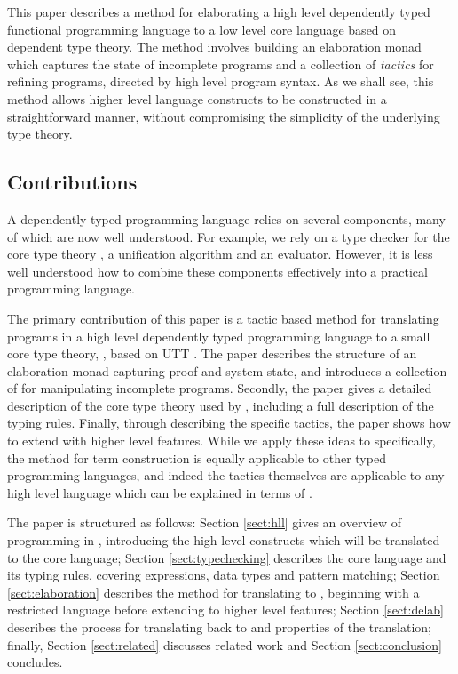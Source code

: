 This paper describes a method for elaborating a high level dependently typed
functional programming language to a low level core language based on dependent
type theory.  The method involves building an elaboration monad which captures
the state of incomplete programs and a collection of \emph{tactics} for
refining programs, directed by high level program syntax.  As we shall see,
this method allows higher level language constructs to be constructed in a
straightforward manner, without compromising the simplicity of the underlying
type theory.

\subsection{Contributions}

A dependently typed programming language relies on several components, many of
which are now well understood. For example, we rely on a type checker for
the core type theory \cite{Chapman2005epigram,loh2010tutorial}, a
unification algorithm \cite{Miller1992} and an evaluator. However, it is less
well understood how to combine these components effectively into a practical
programming language. 

The primary contribution of this paper is a tactic based method for translating
programs in a high level dependently typed programming language to a small core
type theory, \TT{}, based on UTT \cite{luo1994}. The paper describes the
structure of an elaboration monad capturing proof and system state, and
introduces a collection of  for manipulating incomplete
programs.  Secondly, the paper gives a detailed description of the core type
theory used by \Idris{}, including a full description of the typing rules.
Finally, through describing the specific tactics, the paper shows how to extend
\Idris{} with higher level features.  While we apply these ideas to \Idris{}
specifically, the method for term construction is equally applicable to other
typed programming languages, and indeed the tactics themselves are applicable
to any high level language which can be explained in terms of \TT{}.

The paper is structured as follows: Section \ref{sect:hll} gives an overview of
programming in \Idris{}, introducing the high level constructs which will be
translated to the core language; Section \ref{sect:typechecking} describes the
core language \TT{} and its typing rules, covering expressions, data types
and pattern matching; Section \ref{sect:elaboration} describes the method
for translating \Idris{} to \TT{}, beginning with a restricted language
\IdrisM{} before extending to higher level features; Section
\ref{sect:delab} describes the process for translating \TT{} back to \Idris{}
and properties of the translation; finally, 
Section \ref{sect:related} discusses related work and Section \ref{sect:conclusion}
concludes.

